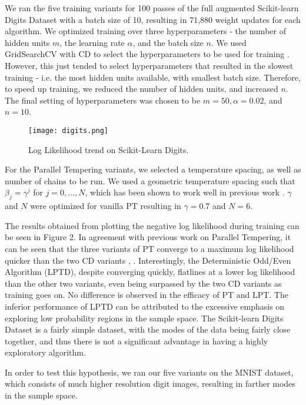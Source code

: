 We ran the five training variants for 100 passes of the full augmented Scikit-learn Digits Dataset with a batch size of 10, resulting in 71,880 weight updates for each algorithm. We optimized training over three hyperparameters - the number of hidden units $m$, the learning rate $\alpha$, and the batch size $n$. We used GridSearchCV with CD to select the hyperparameters to be used for training \cite{pedregosa2011scikit}. However, this just tended to select hyperparameters that resulted in the slowest training - i.e. the most hidden units available, with smallest batch size. Therefore, to speed up training, we reduced the number of hidden units, and increased $n$. The final setting of hyperparameters was chosen to be $m=50,  \alpha = 0.02$, and $n=10$.

\begin{figure}[ht!]
	\centering
	\texttt{[image: digits.png]}
\caption{Log Likelihood trend on Scikit-Learn Digits.}
\end{figure}

For the Parallel Tempering variants, we selected a temperature spacing, as well as number of chains to be run. We used a geometric temperature spacing such that $\beta_j = \gamma^j$  for $j = 0, ..., N$, which has been shown to work well in previous work \cite{kofke2002acceptance}. $\gamma$ and $N$ were optimized for vanilla PT resulting in $\gamma = 0.7$ and $N=6$.

The results obtained from plotting the negative log likelihood during training can be seen in Figure 2. In agreement with previous work on Parallel Tempering, it can be seen that the three variants of PT converge to a maximum log likelihood quicker than the two CD variants \cite{desjardins2010tempered}, \cite{fischer2014training}. Interestingly, the Deterministic Odd/Even Algorithm (LPTD), despite converging quickly, flatlines at a lower log likelihood than the other two variants, even being surpassed by the two CD variants as training goes on. No difference is observed in the efficacy of PT and LPT. The inferior performance of LPTD can be attributed to the excessive emphasis on exploring low probability regions in the sample space. The Scikit-learn Digits Dataset is a fairly simple dataset, with the modes of the data being fairly close together, and thus there is not a significant advantage in having a highly exploratory algorithm.

In order to test this hypothesis, we ran our five variants on the MNIST dataset, which consists of much higher resolution digit images, resulting in farther modes in the sample space.

